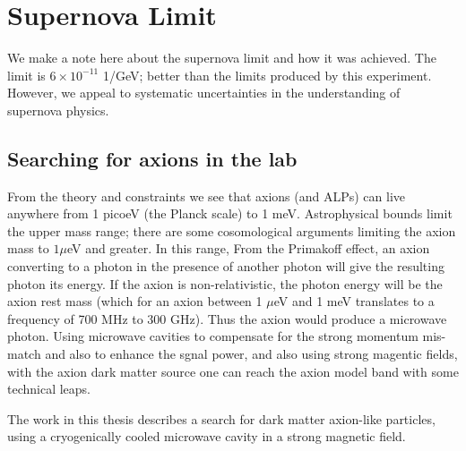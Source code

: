 \documentclass[12pt,twosides]{book}
\begin{document}
\section{Supernova Limit}

We make a note here about the supernova limit and how it was achieved. The limit is $6 \times 10^{-11}$ 1/GeV; better than the limits produced by this experiment. However, we appeal to systematic uncertainties in the understanding of supernova physics.



\subsection{Searching for axions in the lab}

From the theory and constraints we see that axions (and ALPs) can live anywhere from 1 picoeV (the Planck scale) to 1 meV. Astrophysical bounds limit the upper mass range; there are some cosomological arguments limiting the axion mass to $1 \mu$eV and greater. In this range, From the Primakoff effect, an axion converting to a photon in the presence of another photon will give the resulting photon its energy. If the axion is non-relativistic, the photon energy will be the axion rest mass (which for an axion between 1 $\mu$eV and 1 meV translates to a frequency of 700 MHz to 300 GHz). Thus the axion would produce a microwave photon. Using microwave cavities to compensate for the strong momentum mis-match and also to enhance the sgnal power, and also using strong magentic fields, with the axion dark matter source one can reach the axion model band with some technical leaps.

The work in this thesis describes a search for dark matter axion-like particles, using a cryogenically cooled microwave cavity in a strong magnetic field.




\end{document}
